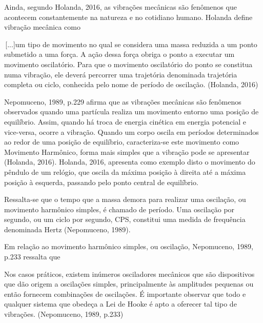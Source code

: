 \documentclass[
	12pt,				
	oneside,			
	a4paper,			
	english,			
	brazil				
	]{abntex2ppgsi}
\begin{document}
Ainda, segundo Holanda, 2016, as vibrações mecânicas são fenômenos que acontecem constantemente na natureza e no cotidiano humano. Holanda define vibração mecânica como

\begin{citacao}
\,[...]um tipo de movimento no qual se considera uma massa reduzida a um ponto submetido a uma força. A ação dessa força obriga o ponto a executar um movimento oscilatório. Para que o movimento oscilatório do ponto se constitua numa vibração, ele deverá percorrer uma trajetória denominada trajetória completa ou ciclo, conhecida pelo nome de período de oscilação. (Holanda, 2016)
\end{citacao}

Nepomuceno, 1989, p.229 afirma que as vibrações mecânicas são fenômenos observados quando uma partícula realiza um movimento entorno uma posição de equilíbrio. Assim, quando há troca de energia cinética em energia potencial e vice-versa, ocorre a vibração. Quando um corpo oscila em períodos determinados ao redor de uma posição de equilíbrio, caracteriza-se este movimento como Movimento Harmônico, forma mais simples que a vibração pode se apresentar (Holanda, 2016). Holanda, 2016, apresenta como exemplo disto o movimento do pêndulo de um relógio, que oscila da máxima posição à direita até a máxima posição à esquerda, passando pelo ponto central de equilíbrio. 



Ressalta-se que o tempo que a massa demora para realizar uma oscilação, ou movimento harmônico simples, é chamado de período. Uma oscilação por segundo, ou um ciclo por segundo, CPS, constitui uma medida de frequência denominada Hertz (Nepomuceno, 1989). 

Em relação ao movimento harmônico simples, ou oscilação, Nepomuceno, 1989, p.233 ressalta que

\begin{citacao}
Nos casos práticos, existem inúmeros osciladores mecânicos que são dispositivos que dão origem a oscilações simples, principalmente às amplitudes pequenas ou então fornecem combinações de oscilações. É importante observar que todo e qualquer sistema que obedeça a Lei de Hooke é apto a oferecer tal tipo de vibrações. (Nepomuceno, 1989, p.233)
\end{citacao}
\end{document}
